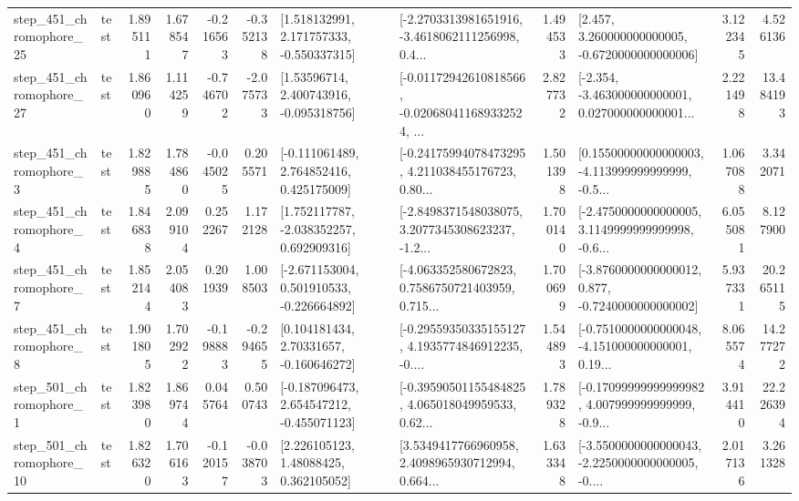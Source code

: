 \begin{tabular}{llrrrrllrlrr}
  step\_451\_chromophore\_25 &      test &      1.895111 &    1.678547 &     -0.216563 & -0.352138 &    [1.518132991, 2.171757333, -0.550337315] &  [-2.2703313981651916, -3.4618062111256998, 0.4... &       1.494533 &    [2.457, 3.260000000000005, -0.6720000000000006] &            3.122345 &          4.526136 \\
  step\_451\_chromophore\_27 &      test &      1.860960 &    1.114259 &     -0.746702 & -2.075733 &     [1.53596714, 2.400743916, -0.095318756] &  [-0.01172942610818566, -0.020680411689332524, ... &       2.827732 &  [-2.354, -3.463000000000001, 0.027000000000001... &            2.221498 &         13.484193 \\
   step\_451\_chromophore\_3 &      test &      1.829885 &    1.784860 &     -0.045025 &  0.205571 &    [-0.111061489, 2.764852416, 0.425175009] &  [-0.24175994078473295, 4.211038455176723, 0.80... &       1.501398 &  [0.15500000000000003, -4.113999999999999, -0.5... &            1.067088 &          3.342071 \\
   step\_451\_chromophore\_4 &      test &      1.846838 &    2.099104 &      0.252267 &  1.172128 &    [1.752117787, -2.038352257, 0.692909316] &  [-2.8498371548038075, 3.2077345308623237, -1.2... &       1.700140 &  [-2.4750000000000005, 3.1149999999999998, -0.6... &            6.055081 &          8.127900 \\
   step\_451\_chromophore\_7 &      test &      1.852144 &    2.054083 &      0.201939 &  1.008503 &   [-2.671153004, 0.501910533, -0.226664892] &  [-4.063352580672823, 0.7586750721403959, 0.715... &       1.700699 &  [-3.8760000000000012, 0.877, -0.7240000000000002] &            5.937331 &         20.265115 \\
   step\_451\_chromophore\_8 &      test &      1.901805 &    1.702922 &     -0.198883 & -0.294655 &     [0.104181434, 2.70331657, -0.160646272] &  [-0.29559350335155127, 4.1935774846912235, -0.... &       1.544893 &  [-0.7510000000000048, -4.151000000000001, 0.19... &            8.065574 &         14.277272 \\
   step\_501\_chromophore\_1 &      test &      1.823980 &    1.869744 &      0.045764 &  0.500743 &   [-0.187096473, 2.654547212, -0.455071123] &  [-0.39590501155484825, 4.065018049959533, 0.62... &       1.789328 &  [-0.17099999999999982, 4.007999999999999, -0.9... &            3.914410 &         22.226394 \\
  step\_501\_chromophore\_10 &      test &      1.826320 &    1.706163 &     -0.120157 & -0.038703 &      [2.226105123, 1.48088425, 0.362105052] &  [3.5349417766960958, 2.4098965930712994, 0.664... &       1.633348 &  [-3.5500000000000043, -2.2250000000000005, -0.... &            2.017136 &          3.261328 \\

\end{tabular}
